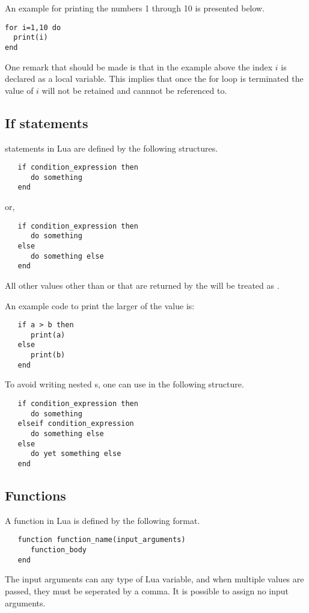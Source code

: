 An example for printing the numbers 1 through 10 is 
presented below.  
\begin{verbatim}
for i=1,10 do
  print(i)  
end
\end{verbatim}
One remark that should be made is that in the example
above the index $i$ is declared as a local variable.
This implies that once the for loop is terminated the
value of $i$ will not be retained and cannnot be referenced
to.

\subsection{If statements}
 statements in Lua are defined by the following 
structures.
\begin{verbatim}
   if condition_expression then
      do something
   end
\end{verbatim}
or,
\begin{verbatim}
   if condition_expression then
      do something
   else
      do something else
   end
\end{verbatim}
All other values other than  or  that
are returned by the  will be 
treated as .

An example code to print the larger of the value 
is:
\begin{verbatim}
   if a > b then
      print(a)
   else
      print(b)
   end
\end{verbatim}

To avoid writing nested s, one can use
 in the following structure.
\begin{verbatim}
   if condition_expression then
      do something
   elseif condition_expression
      do something else
   else
      do yet something else
   end
\end{verbatim}

\subsection{Functions}
A function in Lua is defined by the following 
format.
\begin{verbatim}
   function function_name(input_arguments)
      function_body
   end
\end{verbatim}

The input arguments can any type of Lua variable,
and when multiple values are passed, they must be 
seperated by a comma. It is possible to assign
no input arguments.

